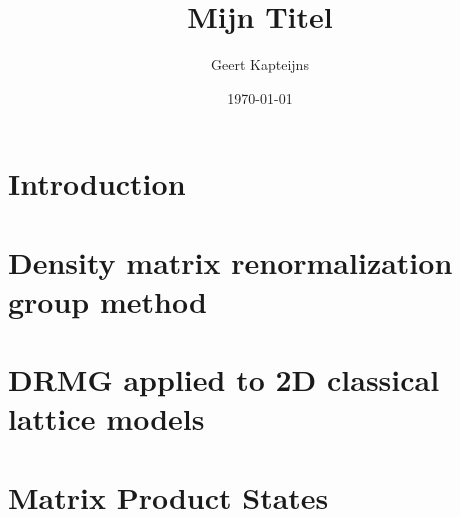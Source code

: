 \documentclass[10pt, ebook, openany, oneside]{memoir}
\begin{document}
\pagestyle{simple}



\frontmatter

\title{Mijn Titel}
\author{Geert Kapteijns}
\date{\today}


\tableofcontents

\mainmatter

\chapter{Introduction}


\chapter{Density matrix renormalization group method}


\chapter{DRMG applied to 2D classical lattice models}


\chapter{Matrix Product States}



%


\backmatter
\printbibliography
\end{document}

